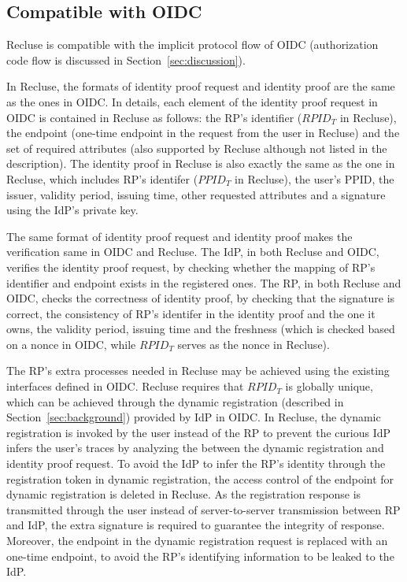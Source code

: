 \subsection{Compatible with OIDC}
\label{subsec:compatible}
Recluse is compatible with the implicit protocol flow of OIDC (authorization code flow is discussed in Section~\ref{sec:discussion}).

In Recluse, the formats of identity proof request and identity proof are the same as the ones in OIDC. In details, each element of the identity proof request in OIDC is contained in Recluse as follows: the RP's identifier ($RPID_T$ in Recluse), the endpoint (one-time endpoint in the request from the user in Recluse) and the set of required attributes (also supported by Recluse although not listed in the description). The identity proof in Recluse is also exactly the same as the one in Recluse, which includes RP's identifer ($PPID_T$ in Recluse), the user's PPID, the issuer, validity period, issuing time, other requested attributes and a signature using the IdP's private key.

The same format of identity proof request and identity proof makes the verification same in OIDC and Recluse. The IdP, in both Recluse and OIDC, verifies the identity proof request, by checking whether the mapping of RP's identifier and endpoint exists in the registered ones. The RP, in both Recluse and OIDC, checks the correctness of identity proof, by checking that the signature is correct, the consistency of RP's identifer in the identity proof and the one it owns, the validity period, issuing time and the freshness (which is checked based on a nonce in  OIDC, while  $RPID_T$ serves as the nonce in Recluse).

The RP's extra processes needed in Recluse may be achieved using the existing interfaces defined in OIDC.  Recluse requires that $RPID_T$ is globally unique, which can be achieved through the dynamic registration (described in Section~\ref{sec:background}) provided by IdP in OIDC. In Recluse, the dynamic registration is invoked by the user instead of the RP to prevent the curious IdP infers the user's traces by analyzing the between the dynamic registration and identity proof request. To avoid the IdP to infer the RP's identity through the registration token in dynamic registration, the access control of the endpoint for dynamic registration is deleted in Recluse. As the registration response is transmitted through the user instead of server-to-server transmission between RP and IdP, the extra signature is required to guarantee the integrity of response. Moreover, the endpoint in the dynamic registration request is replaced with an one-time endpoint, to avoid the RP's identifying information to be leaked to the IdP.


